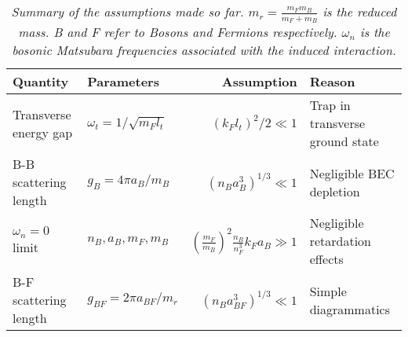 \begin{table}[htb]
\centering
\caption{\textit{Summary of the assumptions made so far. $m_r = \frac{m_Fm_B}{m_F+m_B}$ is the reduced mass. B and F refer to Bosons and Fermions respectively. $\omega_n$ is the bosonic Matsubara frequencies associated with the induced interaction.}}
\begin{tabular}{|l|l|r|l|}
\hline \textbf{Quantity} & \textbf{Parameters} 				& \textbf{Assumption}						& \textbf{Reason}	\\
\hline Transverse energy gap & $\omega_t = 1/\sqrt{m_Fl_t}$ & $(k_Fl_t)^2/2 	\ll 1$ 					& Trap in transverse ground state \\
\hline B-B scattering length & $g_B = 4\pi a_B/m_B$			& $(n_Ba_B^3)^{1/3}	\ll 1$					& Negligible BEC depletion  \\
\hline $\omega_n = 0$ limit  & $n_B, a_B, m_F, m_B$			& $(\frac{m_F}{m_B})^2 \frac{n_B}{n_F^3}k_Fa_B \gg 1$ & Negligible retardation effects  \\
\hline B-F scattering length & $g_{BF} = 2\pi a_{BF}/m_r$ 	& $(n_Ba_{BF}^3)^{1/3}	\ll 1$				& Simple diagrammatics\\
\hline 
\end{tabular}
\label{tab.assumptions}
\end{table}


